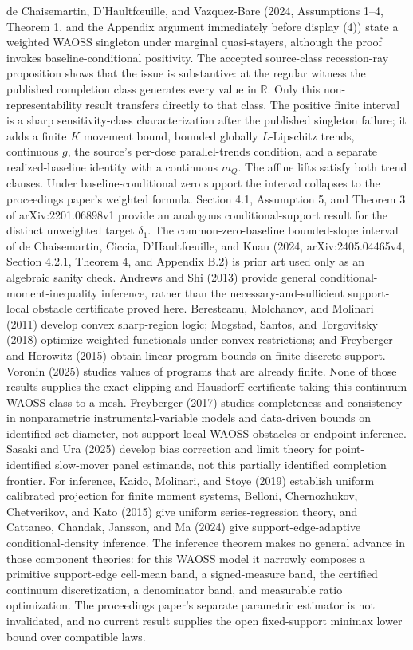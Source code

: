 \documentclass{article}
\begin{document}
de Chaisemartin, D'Haultf\oe{}uille, and Vazquez-Bare (2024, Assumptions 1--4, Theorem 1, and the Appendix argument immediately before display (4)) state a weighted WAOSS singleton under marginal quasi-stayers, although the proof invokes baseline-conditional positivity. The accepted source-class recession-ray proposition shows that the issue is substantive: at the regular witness the published completion class generates every value in \(\mathbb R\). Only this non-representability result transfers directly to that class. The positive finite interval is a sharp sensitivity-class characterization after the published singleton failure; it adds a finite \(K\) movement bound, bounded globally \(L\)-Lipschitz trends, continuous \(g\), the source's per-dose parallel-trends condition, and a separate realized-baseline identity with a continuous \(m_Q\). The affine lifts satisfy both trend clauses. Under baseline-conditional zero support the interval collapses to the proceedings paper's weighted formula. Section 4.1, Assumption 5, and Theorem 3 of arXiv:2201.06898v1 provide an analogous conditional-support result for the distinct unweighted target \(\delta_1\). The common-zero-baseline bounded-slope interval of de Chaisemartin, Ciccia, D'Haultf\oe{}uille, and Knau (2024, arXiv:2405.04465v4, Section 4.2.1, Theorem 4, and Appendix B.2) is prior art used only as an algebraic sanity check. Andrews and Shi (2013) provide general conditional-moment-inequality inference, rather than the necessary-and-sufficient support-local obstacle certificate proved here. Beresteanu, Molchanov, and Molinari (2011) develop convex sharp-region logic; Mogstad, Santos, and Torgovitsky (2018) optimize weighted functionals under convex restrictions; and Freyberger and Horowitz (2015) obtain linear-program bounds on finite discrete support. Voronin (2025) studies values of programs that are already finite. None of those results supplies the exact clipping and Hausdorff certificate taking this continuum WAOSS class to a mesh. Freyberger (2017) studies completeness and consistency in nonparametric instrumental-variable models and data-driven bounds on identified-set diameter, not support-local WAOSS obstacles or endpoint inference. Sasaki and Ura (2025) develop bias correction and limit theory for point-identified slow-mover panel estimands, not this partially identified completion frontier. For inference, Kaido, Molinari, and Stoye (2019) establish uniform calibrated projection for finite moment systems, Belloni, Chernozhukov, Chetverikov, and Kato (2015) give uniform series-regression theory, and Cattaneo, Chandak, Jansson, and Ma (2024) give support-edge-adaptive conditional-density inference. The inference theorem makes no general advance in those component theories: for this WAOSS model it narrowly composes a primitive support-edge cell-mean band, a signed-measure band, the certified continuum discretization, a denominator band, and measurable ratio optimization. The proceedings paper's separate parametric estimator is not invalidated, and no current result supplies the open fixed-support minimax lower bound over compatible laws.
\end{document}
